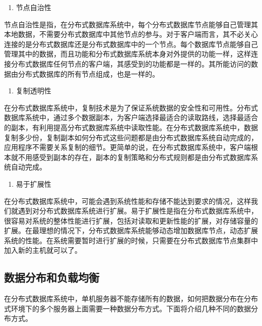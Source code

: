 	\begin{enumerate}[resume]
		\item 节点自治性
	\end{enumerate}

	节点自治性是指，在分布式数据库系统中，每个分布式数据库节点能够自己管理其本地数据，不需要分布式数据库中其他节点的参与。对于客户端而言，其不必关心连接的是分布式数据库还是分布式数据库中的一个节点。每个数据库节点能够自己管理其中的数据，而且功能和分布式数据库系统本身对外提供的功能一样，这样连接分布式数据库任何节点的客户端，其感受到的功能都是一样的。其所能访问的数据由分布式数据库的所有节点组成，也是一样的。

	\begin{enumerate}[resume]
		\item 复制透明性
	\end{enumerate}

	在分布式数据库系统中，复制技术是为了保证系统数据的安全性和可用性。分布式数据库系统中，通过多个数据副本，为客户端选择最适合的读取路线，选择最适合的副本，有利用提高分布式数据库系统中读取性能。在分布式数据库系统中，数据复制多少份，复制副本如何分布式这些问题都是由分布式数据库系统自动完成的，应用程序不需要关系复制的细节。更简单的说，在分布式数据库系统中，客户端根本就不用感受到副本的存在，副本的复制策略和分布式规则都是由分布式数据库系统自动完成。

	\begin{enumerate}[resume]
		\item 易于扩展性
	\end{enumerate}

	在分布式数据库系统中，可能会遇到系统性能和存储不能达到要求的情况，这样我们就遇到对分布式数据库系统进行扩展。易于扩展性是指在分布式数据库系统中，很容易对系统的整体性能进行扩展，包括对读取和更新性能的扩展，对存储容量的扩展。在最理想的情况下，分布式数据库系统能够动态增加数据库节点，动态扩展系统的性能。在系统需要暂时进行扩展的时候，只需要在分布式数据库节点集群中加入新的主机就可以了。
	\subsection{数据分布和负载均衡}
在分布式数据库系统中，单机服务器不能存储所有的数据，如何把数据分布在分布式环境下的多个服务器上面需要一种数据分布方式。下面将介绍几种不同的数据分布方式。 
